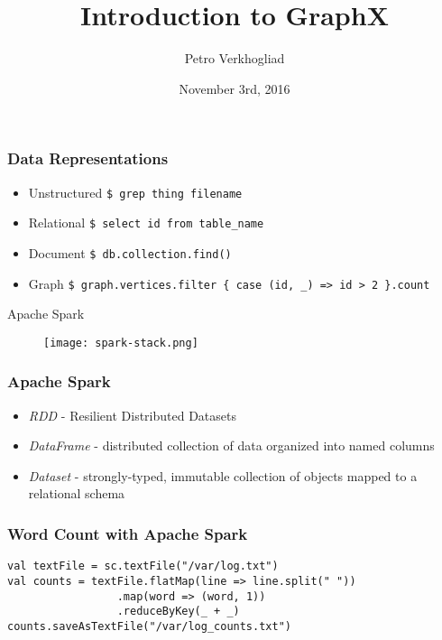 \documentclass{beamer}
\title{Introduction to GraphX}
\author{Petro Verkhogliad}
\date{November 3rd, 2016}
\begin{document}
\begin{frame}
  \titlepage
\end{frame}


\begin{frame}
    \frametitle{Data Representations}
    \begin{itemize}
        \item Unstructured \linebreak \texttt{\scriptsize \$ grep thing filename}
        \item Relational \linebreak \texttt{\scriptsize \$ select id from table\_name}
        \item Document \linebreak \texttt{\scriptsize \$ db.collection.find()}
        \item Graph
            \linebreak \texttt{\scriptsize \$ graph.vertices.filter \{ case (id, \_) => id > 2 \}.count }
    \end{itemize}
\end{frame}

\begin{frame}{Apache Spark}
    \begin{figure}
        \texttt{[image: spark-stack.png]}
    \end{figure}
\end{frame}

\begin{frame}
    \frametitle{Apache Spark}
\begin{itemize}
    \item \emph{RDD} - Resilient Distributed Datasets
    \item \emph{DataFrame} - distributed collection of data organized into named columns
    \item \emph{Dataset} - strongly-typed, immutable collection of objects mapped to a relational schema
\end{itemize}
\end{frame}

\begin{frame}[fragile]
    \frametitle{Word Count with Apache Spark}
    {\scriptsize
        \begin{verbatim}
val textFile = sc.textFile("/var/log.txt")
val counts = textFile.flatMap(line => line.split(" "))
                 .map(word => (word, 1))
                 .reduceByKey(_ + _)
counts.saveAsTextFile("/var/log_counts.txt")
        \end{verbatim}
    }
\end{frame}
\end{document}
